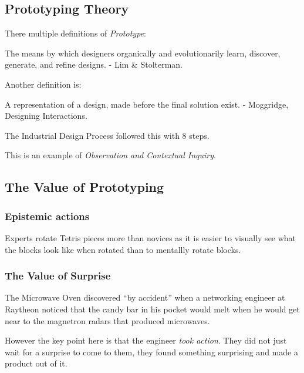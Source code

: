 \subsection{Prototyping Theory}
There multiple definitions of \textit{Prototype}:
\begin{shaded}
The means by which designers organically and evolutionarily learn, discover, generate, and refine designs. - Lim \& Stolterman.
\end{shaded}

Another definition is:
\begin{shaded}
A representation of a design, made before the final solution exist. - Moggridge, Designing Interactions.
\end{shaded}

The Industrial Design Process followed this with 8 steps.

This is an example of \textit{Observation and Contextual Inquiry}.

\subsection{The Value of Prototyping}
\subsubsection{Epistemic actions}
Experts rotate Tetris pieces more than novices as it is easier to visually see what the blocks look like when rotated than to mentallly rotate blocks.

\subsubsection{The Value of Surprise}
The Microwave Oven discovered ``by accident'' when a networking engineer at Raytheon noticed that the candy bar in his pocket would melt when he would get near to the magnetron radars that produced microwaves.

However the key point here is that the engineer \textit{took action}. They did not just wait for a surprise to come to them, they found something surprising and made a product out of it.

